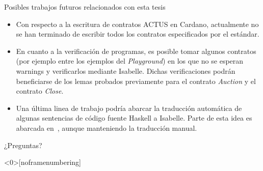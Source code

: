 \documentclass{beamer}
\begin{document}
\begin{frame}{Posibles trabajos futuros relacionados con esta tesis}
    \begin{itemize}
        \item Con respecto a la escritura de contratos ACTUS en Cardano, actualmente no se han terminado de escribir todos los contratos especificados por el estándar.
            \pause

        \item En cuanto a la verificación de programas, es posible tomar algunos contratos (por ejemplo entre los ejemplos del \textit{Playground}) en los que no se esperan warnings y verificarlos mediante Isabelle. Dichas verificaciones podrán beneficiarse de los lemas probados previamente para el contrato \textit{Auction} y el contrato \textit{Close}.
            \pause

        \item Una última linea de trabajo podría abarcar la traducción automática de algunas sentencias de código fuente Haskell a Isabelle. Parte de esta idea es abarcada en~\cite{translating-haskell-to-isabelle}, aunque manteniendo la traducción manual.
    \end{itemize}
\end{frame}

\begin{frame}
\begin{center}
    \Huge ¿Preguntas?
\end{center}
\end{frame}

\begin{frame}<0>[noframenumbering]
    
    
\end{frame}
\end{document}
